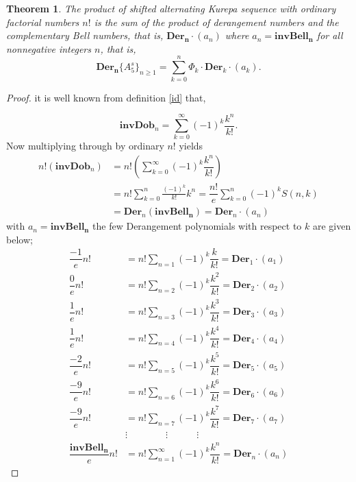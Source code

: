 \documentclass[pdflatex,sn-mathphys-num]{sn-jnl}%
\newtheorem{theorem}{Theorem}
\theoremstyle{thmstyleone}%
\theoremstyle{thmstyletwo}%
\theoremstyle{thmstylethree}%
\begin{document}
\begin{theorem}\label{ok}
    The product of shifted alternating Kurepa sequence with ordinary factorial numbers $n!$ is the sum of the product of derangement numbers and the complementary Bell numbers, that is, $\mathbf{Der_n}\cdotp(a_n)$ where $a_n= \mathbf{invBell_n}$ for all nonnegative integers $n$, that is, 
    $$ \mathbf{Der_n}\lbrace A_5^s\rbrace_{n\geq 1}=\sum_{k=0}^{n} \Phi_k \cdotp\mathbf{Der}_{k}\cdotp(a_k).$$
\end{theorem}
\begin{proof}
it is well known from definition \ref{id} that,

 $$\mathbf{invDob}_n=\sum_{k=0}^{\infty}(-1)^k\dfrac{k^n}{k!}. $$
Now multiplying through by ordinary $n!$ yields 
\begin{align}
    n!(\mathbf{invDob}_n)&= n!\left(\sum_{k=0}^{\infty}(-1)^k\dfrac{k^n}{k!}\right)\\
     &= n!\sum_{k=0}^{n}\frac{(-1)^k}{k!}k^n=\dfrac{n!}{e}\sum_{k=0}^{n}(-1)^k S(n,k)\\
     &= \mathbf{Der}_n\left(\mathbf{invBell_n}\right)=\mathbf{Der}_n\cdotp(a_n)
\end{align}
with $a_n=\mathbf{invBell_n}$ the few Derangement polynomials with respect to $k$ are given below;
\begin{align}
    \dfrac{-1}{e}n!&= n!\sum_{n=1}(-1)^k\dfrac{k}{k!}=\mathbf{Der}_1 \cdotp(a_1)\\ \nonumber
   \dfrac{0}{e}n!&=n!\sum_{n=2}(-1)^k\dfrac{k^2}{k!}=\mathbf{Der}_2 \cdotp(a_2)\\ \nonumber
    \dfrac{1}{e}n!&=n!\sum_{n=3}(-1)^k\dfrac{k^3}{k!}=\mathbf{Der}_3 \cdotp(a_3)\\ \nonumber
    \dfrac{1}{e}n!&= n!\sum_{n=4}(-1)^k\dfrac{k^4}{k!}=\mathbf{Der}_4 \cdotp(a_4)\\ \nonumber
    \dfrac{-2}{e}n!&=n!\sum_{n=5}(-1)^k\dfrac{k^5}{k!}=\mathbf{Der}_5 \cdotp(a_5)\\ \nonumber
   \dfrac{-9}{e}n!&= n!\sum_{n=6}(-1)^k\dfrac{k^6}{k!}=\mathbf{Der}_6 \cdotp(a_6)\\ \nonumber
    \dfrac{-9}{e}n!&=n!\sum_{n=7}(-1)^k\dfrac{k^7}{k!}=\mathbf{Der}_7 \cdotp(a_7) \\ \nonumber
    &\vdots \quad \quad \quad \quad \vdots \quad \quad \quad\vdots \quad \quad \quad \quad \quad \quad \quad\\
    \dfrac{\mathbf{invBell_{n}}}{e}n!&=n!\sum_{n=1}^{\infty}(-1)^k\dfrac{k^n}{k!}=\mathbf{Der}_{n}\cdotp(a_n)
\end{align}

\end{proof}
\end{document}
